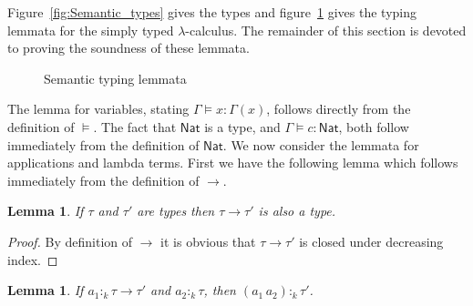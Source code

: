 \documentclass[10pt,a4paper,final,twocolumn]{article}
\theoremstyle{definition}
\theoremstyle{plain}
\newtheorem{lemma}[definition]{Lemma}
\newcommand{\abstr}[2]{\ensuremath{\lambda{#1}.\,{#2}}}
\newcommand{\app}[2]{\ensuremath{{#1}\,{#2}}}
\newcommand{\Nat}{\ensuremath{\mathsf{Nat}}}
\begin{document}
Figure~\ref{fig:Semantic_types} gives the types and figure~\ref{fig:Semantic_typing_lemmata} gives the
typing lemmata for the simply typed $\lambda$-calculus.
The remainder of this section is devoted to proving the soundness of these lemmata.
\begin{figure}[htb]
  \centering
  \caption{Semantic typing lemmata}
  \label{fig:Semantic_typing_lemmata}
\end{figure}

The lemma for variables, stating \mbox{$\Gamma \models x : \Gamma(x)$}, follows directly from the definition of
$\models$. The fact that $\Nat$ is a type, and \mbox{$\Gamma \models c : \Nat$},
both follow immediately from the definition of $\Nat$. We now consider the lemmata for
applications and lambda terms. First we have the following lemma which follows immediately
from the definition of $\to$.
\begin{lemma}
  If $\tau$ and $\tau'$ are types then \mbox{$\tau \to \tau'$} is also a type.
\end{lemma}

\begin{proof}
  By definition of $\to$ it is obvious that \mbox{$\tau \to \tau'$} is closed
  under decreasing index.
\end{proof}

\begin{lemma} \label{lem:Application}
  If \mbox{$a_1 :_k \tau \to \tau'$} and \mbox{$a_2 :_k \tau$}, then \mbox{$(\app{a_1}{a_2}) :_k \tau'$}.
\end{lemma}
\end{document}
